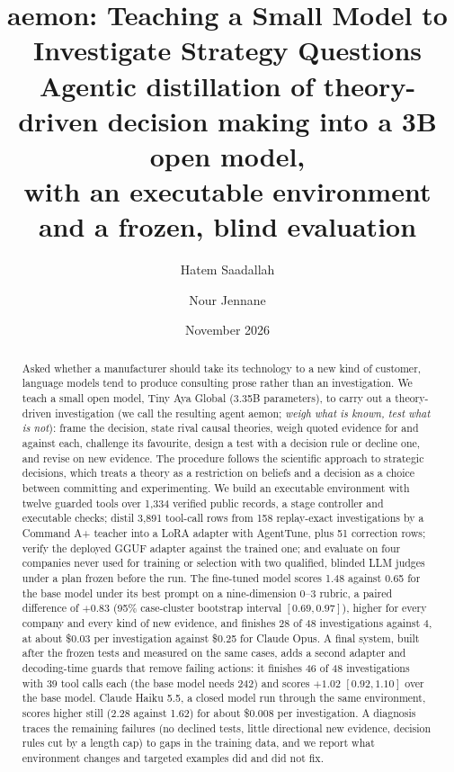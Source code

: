 \documentclass[11pt]{article}
\title{\textbf{aemon: Teaching a Small Model to Investigate Strategy Questions}\\[4pt]
\large Agentic distillation of theory-driven decision making into a 3B open model,\\ with an executable environment and a frozen, blind evaluation}
\author{Hatem Saadallah \and Nour Jennane}
\date{November 2026}
\begin{document}
\maketitle
\thispagestyle{empty}

\begin{abstract}
\noindent Asked whether a manufacturer should take its technology to a new kind of customer, language models tend to
produce consulting prose rather than an investigation. We teach a small open model, Tiny Aya Global (3.35B parameters),
to carry out a theory-driven investigation (we call the resulting agent aemon; \emph{weigh what is known, test what is not}): frame the decision, state rival causal theories, weigh quoted evidence for
and against each, challenge its favourite, design a test with a decision rule or decline one, and revise on new
evidence. The procedure follows the scientific approach to strategic decisions, which treats a theory as a restriction on
beliefs and a decision as a choice between committing and experimenting. We build an executable environment with twelve
guarded tools over 1{,}334 verified public records, a stage controller and executable checks; distil 3{,}891 tool-call
rows from 158 replay-exact investigations by a Command A+ teacher into a LoRA adapter with AgentTune, plus 51 correction
rows; verify the deployed GGUF adapter against the trained one; and evaluate on four companies never used for training
or selection with two qualified, blinded LLM judges under a plan frozen before the run. The fine-tuned model scores 1.48
against 0.65 for the base model under its best prompt on a nine-dimension 0--3 rubric, a paired difference of $+0.83$
(95\% case-cluster bootstrap interval $[0.69, 0.97]$), higher for every company and every kind of new evidence, and
finishes 28 of 48 investigations against 4, at about \$0.03 per investigation against \$0.25 for Claude Opus. A final
system, built after the frozen tests and measured on the same cases, adds a second adapter and decoding-time guards
that remove failing actions: it finishes 46 of 48 investigations with 39 tool calls each (the base model needs 242)
and scores $+1.02$ $[0.92, 1.10]$ over the base model. Claude Haiku 5.5, a closed model run through the same
environment, scores higher still (2.28 against 1.62) for about \$0.008 per investigation. A diagnosis
traces the remaining failures (no declined tests, little directional new evidence, decision rules cut by a length cap)
to gaps in the training data, and we report what environment changes and targeted examples did and did not fix.
\end{abstract}
\end{document}
